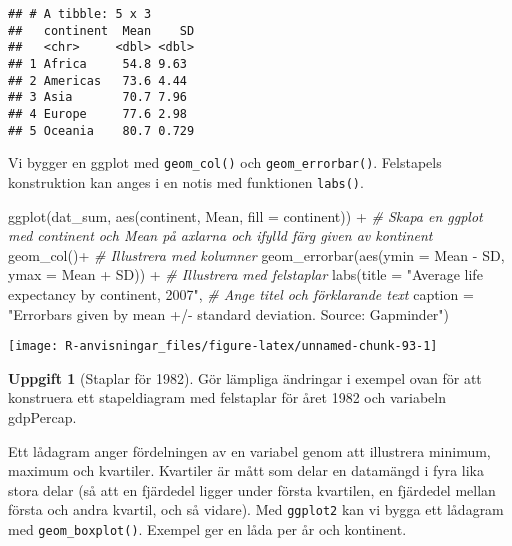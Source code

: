 \documentclass[
]{book}
\newenvironment{Shaded}{\begin{snugshade}}{\end{snugshade}}
\newcommand{\AttributeTok}[1]{\textcolor[rgb]{0.77,0.63,0.00}{#1}}
\newcommand{\CommentTok}[1]{\textcolor[rgb]{0.56,0.35,0.01}{\textit{#1}}}
\newcommand{\FunctionTok}[1]{\textcolor[rgb]{0.00,0.00,0.00}{#1}}
\newcommand{\NormalTok}[1]{#1}
\newcommand{\SpecialCharTok}[1]{\textcolor[rgb]{0.00,0.00,0.00}{#1}}
\newcommand{\StringTok}[1]{\textcolor[rgb]{0.31,0.60,0.02}{#1}}
\theoremstyle{definition}
\theoremstyle{definition}
\theoremstyle{definition}
\newtheorem{exercise}{Uppgift}[chapter]
\theoremstyle{definition}
\theoremstyle{remark}
\begin{document}
\begin{verbatim}
## # A tibble: 5 x 3
##   continent  Mean    SD
##   <chr>     <dbl> <dbl>
## 1 Africa     54.8 9.63 
## 2 Americas   73.6 4.44 
## 3 Asia       70.7 7.96 
## 4 Europe     77.6 2.98 
## 5 Oceania    80.7 0.729
\end{verbatim}

Vi bygger en ggplot med \texttt{geom\_col()} och \texttt{geom\_errorbar()}. Felstapels konstruktion kan anges i en notis med funktionen \texttt{labs()}.

\begin{Shaded}
\begin{Highlighting}[]
\FunctionTok{ggplot}\NormalTok{(dat\_sum, }\FunctionTok{aes}\NormalTok{(continent, Mean, }\AttributeTok{fill =}\NormalTok{ continent)) }\SpecialCharTok{+}          \CommentTok{\# Skapa en ggplot med continent och Mean på axlarna och ifylld färg given av kontinent}
  \FunctionTok{geom\_col}\NormalTok{()}\SpecialCharTok{+}                                                      \CommentTok{\# Illustrera med kolumner}
  \FunctionTok{geom\_errorbar}\NormalTok{(}\FunctionTok{aes}\NormalTok{(}\AttributeTok{ymin =}\NormalTok{ Mean }\SpecialCharTok{{-}}\NormalTok{ SD, }\AttributeTok{ymax =}\NormalTok{ Mean }\SpecialCharTok{+}\NormalTok{ SD)) }\SpecialCharTok{+}         \CommentTok{\# Illustrera med felstaplar}
  \FunctionTok{labs}\NormalTok{(}\AttributeTok{title =} \StringTok{"Average life expectancy by continent, 2007"}\NormalTok{,       }\CommentTok{\# Ange titel och förklarande text}
       \AttributeTok{caption =} \StringTok{"Errorbars given by mean +/{-} standard deviation.}
\StringTok{       Source: Gapminder"}\NormalTok{)}
\end{Highlighting}
\end{Shaded}

\begin{center}\texttt{[image: R-anvisningar\_files/figure-latex/unnamed-chunk-93-1]} \end{center}

\begin{exercise}[Staplar för 1982]
Gör lämpliga ändringar i exempel ovan för att konstruera ett stapeldiagram med felstaplar för året 1982 och variabeln gdpPercap.
\end{exercise}

Ett lådagram anger fördelningen av en variabel genom att illustrera minimum, maximum och kvartiler. Kvartiler är mått som delar en datamängd i fyra lika stora delar (så att en fjärdedel ligger under första kvartilen, en fjärdedel mellan första och andra kvartil, och så vidare). Med \texttt{ggplot2} kan vi bygga ett lådagram med \texttt{geom\_boxplot()}. Exempel ger en låda per år och kontinent.
\end{document}
